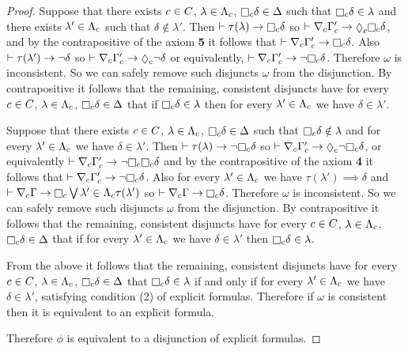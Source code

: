 \begin{proof}
Suppose that there exists $c \in C$, $\lambda \in \Lambda_c$, $\necessaryC \delta \in \Delta$ such that $\necessaryC \delta \in \lambda$ and there exists $\lambda' \in \Lambda_c$ such that $\delta \notin \lambda'$.
Then $\proves \tau(\lambda) \implies \necessaryC \delta$ so $\proves \coversC \Gamma'_\agentC \implies \possibleC \necessaryC \delta$, and by the contrapositive of the \axiomS{} axiom {\bf 5} it follows that $\proves \coversC \Gamma'_\agentC \implies \necessaryC \delta$.
Also $\vdash \tau(\lambda') \rightarrow \lnot \delta$ so $\proves \coversC \Gamma'_\agentC \implies \possibleC \lnot \delta$ or equivalently, $\proves \coversC \Gamma'_\agentC \implies \lnot \necessaryC \delta$.
Therefore $\omega$ is inconsistent.
So we can safely remove such disjuncts $\omega$ from the disjunction.
By contrapositive it follows that the remaining, consistent disjuncts have for every $c \in C$, $\lambda \in \Lambda_c$, $\necessaryC \delta \in \Delta$ that if $\necessaryC \delta \in \lambda$ then for every $\lambda' \in \Lambda_c$ we have $\delta \in \lambda'$.

Suppose that there exists $c \in C$, $\lambda \in \Lambda_c$, $\necessaryC \delta \in \Delta$ such that $\necessaryC \delta \notin \lambda$ and for every $\lambda' \in \Lambda_c$ we have $\delta \in \lambda'$.
Then $\proves \tau(\lambda) \implies \lnot \necessaryC \delta$ so $\proves \coversC \Gamma'_\agentC \implies \possibleC \lnot \necessaryC \delta$, or equivalently $\proves \coversC \Gamma'_\agentC \implies \lnot \necessaryC \necessaryC \delta$ and by the contrapositive of the \axiomS{} axiom {\bf 4} it follows that $\proves \coversC \Gamma'_\agentC \implies \lnot \necessaryC \delta$.
Also for every $\lambda' \in \Lambda_c$ we have $\tau(\lambda') \implies \delta$ and $\proves \coversC \Gamma \implies \necessaryC \bigvee{\lambda' \in \Lambda_\agentC} \tau(\lambda')$ so $\proves \coversC \Gamma \implies \necessaryC \delta$.
Therefore $\omega$ is inconsistent.
So we can safely remove such disjuncts $\omega$ from the disjunction.
By contrapositive it follows that the remaining, consistent disjuncts have for every $c \in C$, $\lambda \in \Lambda_c$, $\necessaryC \delta \in \Delta$ that if for every $\lambda' \in \Lambda_c$ we have $\delta \in \lambda'$ then $\necessaryC \delta \in \lambda$.

From the above it follows that the remaining, consistent disjuncts have for every $c \in C$, $\lambda \in \Lambda_c$, $\necessaryC \delta \in \Delta$ that $\necessaryC \delta \in \lambda$ if and only if for every $\lambda' \in \Lambda_c$ we have $\delta \in \lambda'$, satisfying condition (2) of explicit formulas.
Therefore if $\omega$ is consistent then it is equivalent to an explicit formula.

Therefore $\phi$ is equivalent to a disjunction of explicit formulas.
\end{proof}

